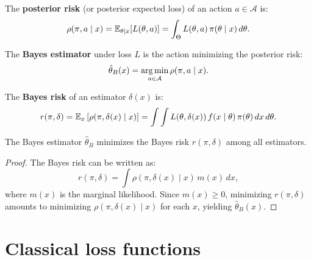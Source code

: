 \begin{definition}
The \textbf{posterior risk} (or posterior expected loss) of an action
$a \in \mathcal{A}$ is:
\[
  \rho(\pi, a \mid x) = \mathbb{E}_{\theta \mid x}[L(\theta, a)]
  = \int_\Theta L(\theta, a)\,\pi(\theta \mid x)\,d\theta.
\]
\end{definition}

\begin{definition}
The \textbf{Bayes estimator} under loss $L$ is the action minimizing
the posterior risk:
\[
  \hat{\theta}_B(x) = \operatorname*{arg\,min}_{a \in \mathcal{A}} \rho(\pi, a \mid x).
\]
\end{definition}

\begin{definition}
The \textbf{Bayes risk} of an estimator $\delta(x)$ is:
\[
  r(\pi, \delta) = \mathbb{E}_x\left[\rho(\pi, \delta(x) \mid x)\right]
  = \int \int L(\theta, \delta(x))\,f(x \mid \theta)\,\pi(\theta)\,dx\,d\theta.
\]
\end{definition}

\begin{theorem}
The Bayes estimator $\hat{\theta}_B$ minimizes the Bayes risk
$r(\pi, \delta)$ among all estimators.
\end{theorem}

\begin{proof}
The Bayes risk can be written as:
\[
  r(\pi, \delta) = \int \rho(\pi, \delta(x) \mid x)\,m(x)\,dx,
\]
where $m(x)$ is the marginal likelihood. Since $m(x) \geq 0$,
minimizing $r(\pi, \delta)$ amounts to minimizing
$\rho(\pi, \delta(x) \mid x)$ for each $x$, yielding $\hat{\theta}_B(x)$.
\end{proof}

\section{Classical loss functions}

